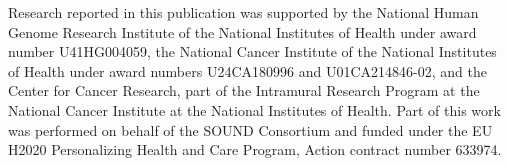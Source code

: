 \documentclass[9pt,a4paper]{extarticle}\usepackage[]{graphicx}\usepackage[]{color}
\begin{document}
Research reported in this publication was supported by the National
Human Genome Research Institute of the National Institutes of Health
under award number U41HG004059, the National Cancer Institute of the
National Institutes of Health under award numbers U24CA180996 and
U01CA214846-02, and the Center for Cancer Research, part of the
Intramural Research Program at the National Cancer Institute at the
National Institutes of Health. Part of this work was performed on
behalf of the SOUND Consortium and funded under the EU H2020
Personalizing Health and Care Program, Action contract number 633974.



%
%
%
%
%
%
%

\end{document}
